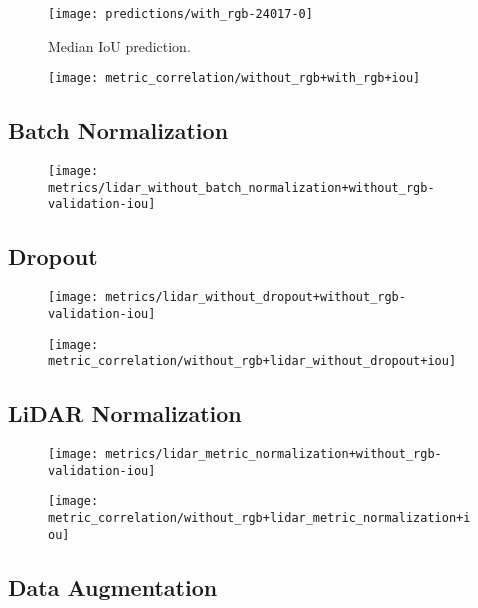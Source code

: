 \begin{figure}[H]
  \centering
  \texttt{[image: predictions/with\_rgb-24017-0]}  %
  \caption{%
    Median IoU prediction.
  }
\end{figure}

\begin{figure}[H]
  \centering
  \texttt{[image: metric\_correlation/without\_rgb+with\_rgb+iou]}
\end{figure}

\subsection{Batch Normalization}

\begin{figure}[H]
  \centering
  \texttt{[image: metrics/lidar\_without\_batch\_normalization+without\_rgb-validation-iou]}
\end{figure}

\subsection{Dropout}

\begin{figure}[H]
  \centering
  \texttt{[image: metrics/lidar\_without\_dropout+without\_rgb-validation-iou]}
\end{figure}

\begin{figure}[H]
  \centering
  \texttt{[image: metric\_correlation/without\_rgb+lidar\_without\_dropout+iou]}
\end{figure}

\subsection{LiDAR Normalization}

\begin{figure}[H]
  \centering
  \texttt{[image: metrics/lidar\_metric\_normalization+without\_rgb-validation-iou]}
\end{figure}

\begin{figure}[H]
  \centering
  \texttt{[image: metric\_correlation/without\_rgb+lidar\_metric\_normalization+iou]}
\end{figure}

\subsection{Data Augmentation}

